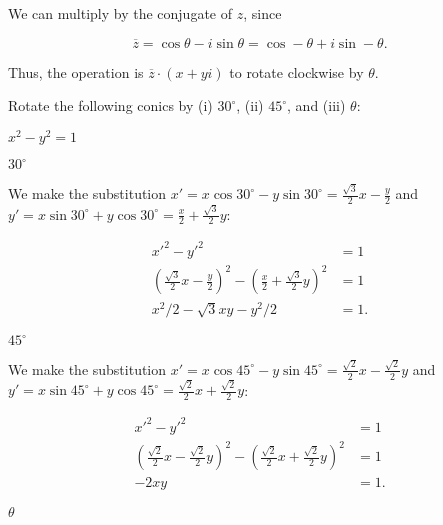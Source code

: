 \documentclass[../gatm_answers.tex]{subfiles}
\begin{document}
\noindent We can multiply by the conjugate of $z$, since

$$\overline{z}=\cos\theta - i\sin\theta = \cos-\theta + i\sin-\theta.$$

\noindent Thus, the operation is $\overline{z}\cdot (x+yi)$ to rotate clockwise by $\theta$.

\begin{outer_problem}
\item Rotate the following conics by (i) $30^\circ$, (ii) $45^\circ$, and (iii) $\theta$:
\end{outer_problem}

\begin{inner_problem}[start=1]
\item $x^2-y^2=1$
\end{inner_problem}

\begin{iinner_problem}[start=1]
\item $30^\circ$
\end{iinner_problem}

\noindent We make the substitution $x'=x \cos 30^\circ - y\sin 30^\circ=\frac{\sqrt{3}}{2}x-\frac{y}{2}$ and $y'=x\sin 30^\circ + y\cos 30^\circ=\frac{x}{2}+\frac{\sqrt{3}}{2}y$:

\begin{align*}
x'^2-y'^2&=1 \\
\left(\frac{\sqrt{3}}{2}x-\frac{y}{2}\right)^2 - \left(\frac{x}{2}+\frac{\sqrt{3}}{2}y\right)^2 &= 1 \\
x^2/2 - \sqrt{3} x y - y^2/2 &= 1.
\end{align*}

\begin{iinner_problem}
\item $45^\circ$
\end{iinner_problem}

\noindent We make the substitution $x'=x \cos 45^\circ - y\sin 45^\circ=\frac{\sqrt{2}}{2}x-\frac{\sqrt{2}}{2}y$ and $y'=x\sin 45^\circ + y\cos 45^\circ=\frac{\sqrt{2}}{2}x+\frac{\sqrt{2}}{2}y$:

\begin{align*}
x'^2-y'^2 &= 1 \\
\left(\frac{\sqrt{2}}{2}x-\frac{\sqrt{2}}{2}y\right)^2 - \left(\frac{\sqrt{2}}{2}x+\frac{\sqrt{2}}{2}y\right)^2 &= 1 \\
-2xy &= 1.
\end{align*}

\begin{iinner_problem}
\item $\theta$
\end{iinner_problem}
\end{document}

